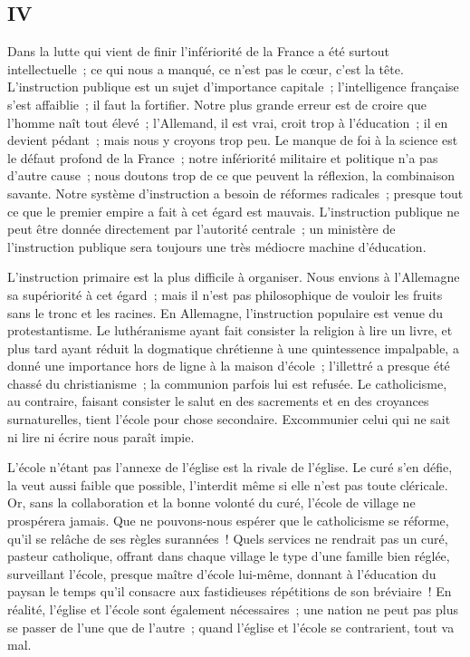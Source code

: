 \documentclass[french,twoside]{book} %
\begin{document}
\subsection[{IV}]{IV}
\noindent Dans la lutte qui vient de finir l’infériorité de la France a été surtout intellectuelle ; ce qui nous a manqué, ce n’est pas le cœur, c’est la tête. L’instruction publique est un sujet d’importance capitale ; l’intelligence française s’est affaiblie ; il faut la fortifier. Notre plus grande erreur est de croire que l’homme naît tout élevé ; l’Allemand, il est vrai, croit trop à l’éducation ; il en devient pédant ; mais nous y croyons trop peu. Le manque de foi à la science est le défaut profond de la France ; notre infériorité militaire et politique n’a pas d’autre cause ; nous doutons trop de ce que peuvent la réflexion, la combinaison savante. Notre système d’instruction a besoin de réformes radicales ; presque tout ce que le premier empire a fait à cet égard est mauvais. L’instruction publique ne peut être donnée directement par l’autorité centrale ; un ministère de l’instruction publique sera toujours une très médiocre machine d’éducation.\par
L’instruction primaire est la plus difficile à organiser. Nous envions à l’Allemagne sa supériorité à cet égard ; mais il n’est pas philosophique de vouloir les fruits sans le tronc et les racines. En Allemagne, l’instruction populaire est venue du protestantisme. Le luthéranisme ayant fait consister la religion à lire un livre, et plus tard ayant réduit la dogmatique chrétienne à une quintessence impalpable, a donné une importance hors de ligne à la maison d’école ; l’illettré a presque été chassé du christianisme ; la communion parfois lui est refusée. Le catholicisme, au contraire, faisant consister le salut en des sacrements et en des croyances surnaturelles, tient l’école pour chose secondaire. Excommunier celui qui ne sait ni lire ni écrire nous paraît impie.\par
L’école n’étant pas l’annexe de l’église est la rivale de l’église. Le curé s’en défie, la veut aussi faible que possible, l’interdit même si elle n’est pas toute cléricale. Or, sans la collaboration et la bonne volonté du curé, l’école de village ne prospérera jamais. Que ne pouvons-nous espérer que le catholicisme se réforme, qu’il se relâche de ses règles surannées ! Quels services ne rendrait pas un curé, pasteur catholique, offrant dans chaque village le type d’une famille bien réglée, surveillant l’école, presque maître d’école lui-même, donnant à l’éducation du paysan le temps qu’il consacre aux fastidieuses répétitions de son bréviaire ! En réalité, l’église et l’école sont également nécessaires ; une nation ne peut pas plus se passer de l’une que de l’autre ; quand l’église et l’école se contrarient, tout va mal.\par
\end{document}

